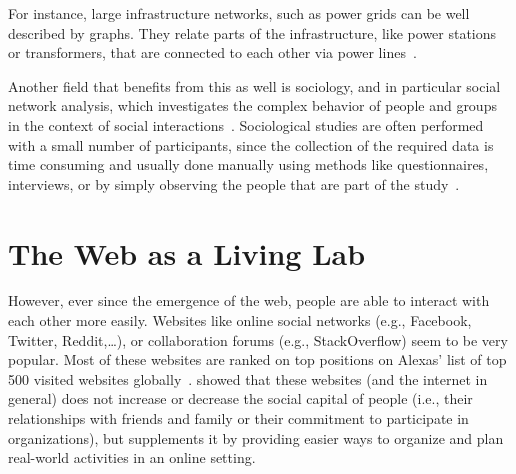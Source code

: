 For instance, large infrastructure networks, such as power grids can be well described by graphs.
They relate parts of the infrastructure, like power stations or transformers, that are connected to each other via power lines~\cite{Watts1998}.

Another field that benefits from this as well is sociology, and in particular social network analysis, which investigates the complex behavior of people and groups in the context of social interactions~\cite{Newman2010}.
Sociological studies are often performed with a small number of participants, since the collection of the required data is time consuming and usually done manually using methods like questionnaires, interviews, or by simply observing the people that are part of the study~\cite{Wasserman1994}.




\section{The Web as a Living Lab}
\label{sec:the-web-as-lab}

However, ever since the emergence of the web, people are able to interact with each other more easily.
Websites like online social networks (e.g., Facebook, Twitter, Reddit,\ldots), or collaboration forums (e.g., StackOverflow) seem to be very popular.
Most of these websites are ranked on top positions on Alexas' list of top 500 visited websites globally~\cite{Alexa2017}.
\citet{Wellman2001} showed that these websites (and the internet in general) does not increase or decrease the social capital of people (i.e., their relationships with friends and family or their commitment to participate in organizations), but supplements it by providing easier ways to organize and plan real-world activities in an online setting.

